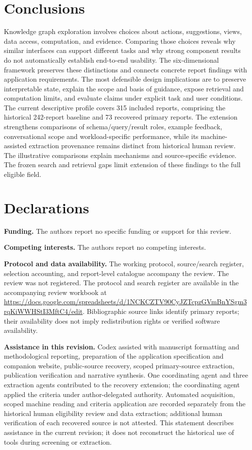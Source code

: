 \documentclass[manuscript,review,screen]{acmart}
\begin{document}
\section{Conclusions}
Knowledge graph exploration involves choices about actions, suggestions, views, data access, computation, and evidence. Comparing those choices reveals why similar interfaces can support different tasks and why strong component results do not automatically establish end-to-end usability. The six-dimensional framework preserves these distinctions and connects concrete report findings with application requirements. The most defensible design implications are to preserve interpretable state, explain the scope and basis of guidance, expose retrieval and computation limits, and evaluate claims under explicit task and user conditions. The current descriptive profile covers 315 included reports, comprising the historical 242-report baseline and 73 recovered primary reports. The extension strengthens comparisons of schema/query/result roles, example feedback, conversational scope and workload-specific performance, while its machine-assisted extraction provenance remains distinct from historical human review. The illustrative comparisons explain mechanisms and source-specific evidence. The frozen search and retrieval gaps limit extension of these findings to the full eligible field.

\section*{Declarations}
\textbf{Funding.} The authors report no specific funding or support for this review.

\noindent\textbf{Competing interests.} The authors report no competing interests.

\noindent\textbf{Protocol and data availability.} The working protocol, source/search register, selection accounting, and report-level catalogue accompany the review. The review was not registered. The protocol and search register are available in the accompanying review workbook at \url{https://docs.google.com/spreadsheets/d/1NCKCZTV90CyJZTcpzGVmBnYSgm3rqKiWWHStI3MftC4/edit}. Bibliographic source links identify primary reports; their availability does not imply redistribution rights or verified software availability.

\noindent\textbf{Assistance in this revision.} Codex assisted with manuscript formatting and methodological reporting, preparation of the application specification and companion website, public-source recovery, scoped primary-source extraction, publication verification and narrative synthesis. One coordinating agent and three extraction agents contributed to the recovery extension; the coordinating agent applied the criteria under author-delegated authority. Automated acquisition, scoped machine reading and criteria application are recorded separately from the historical human eligibility review and data extraction; additional human verification of each recovered source is not attested. This statement describes assistance in the current revision; it does not reconstruct the historical use of tools during screening or extraction.
\end{document}
